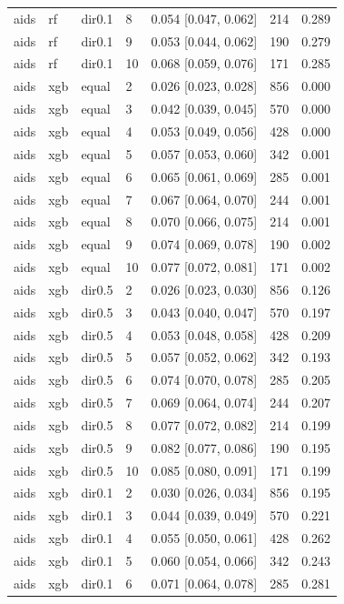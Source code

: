 \begin{tabular}{lllllll}
aids & rf & dir0.1 & 8 & 0.054 [0.047, 0.062] & 214 & 0.289 \\
aids & rf & dir0.1 & 9 & 0.053 [0.044, 0.062] & 190 & 0.279 \\
aids & rf & dir0.1 & 10 & 0.068 [0.059, 0.076] & 171 & 0.285 \\
aids & xgb & equal & 2 & 0.026 [0.023, 0.028] & 856 & 0.000 \\
aids & xgb & equal & 3 & 0.042 [0.039, 0.045] & 570 & 0.000 \\
aids & xgb & equal & 4 & 0.053 [0.049, 0.056] & 428 & 0.000 \\
aids & xgb & equal & 5 & 0.057 [0.053, 0.060] & 342 & 0.001 \\
aids & xgb & equal & 6 & 0.065 [0.061, 0.069] & 285 & 0.001 \\
aids & xgb & equal & 7 & 0.067 [0.064, 0.070] & 244 & 0.001 \\
aids & xgb & equal & 8 & 0.070 [0.066, 0.075] & 214 & 0.001 \\
aids & xgb & equal & 9 & 0.074 [0.069, 0.078] & 190 & 0.002 \\
aids & xgb & equal & 10 & 0.077 [0.072, 0.081] & 171 & 0.002 \\
aids & xgb & dir0.5 & 2 & 0.026 [0.023, 0.030] & 856 & 0.126 \\
aids & xgb & dir0.5 & 3 & 0.043 [0.040, 0.047] & 570 & 0.197 \\
aids & xgb & dir0.5 & 4 & 0.053 [0.048, 0.058] & 428 & 0.209 \\
aids & xgb & dir0.5 & 5 & 0.057 [0.052, 0.062] & 342 & 0.193 \\
aids & xgb & dir0.5 & 6 & 0.074 [0.070, 0.078] & 285 & 0.205 \\
aids & xgb & dir0.5 & 7 & 0.069 [0.064, 0.074] & 244 & 0.207 \\
aids & xgb & dir0.5 & 8 & 0.077 [0.072, 0.082] & 214 & 0.199 \\
aids & xgb & dir0.5 & 9 & 0.082 [0.077, 0.086] & 190 & 0.195 \\
aids & xgb & dir0.5 & 10 & 0.085 [0.080, 0.091] & 171 & 0.199 \\
aids & xgb & dir0.1 & 2 & 0.030 [0.026, 0.034] & 856 & 0.195 \\
aids & xgb & dir0.1 & 3 & 0.044 [0.039, 0.049] & 570 & 0.221 \\
aids & xgb & dir0.1 & 4 & 0.055 [0.050, 0.061] & 428 & 0.262 \\
aids & xgb & dir0.1 & 5 & 0.060 [0.054, 0.066] & 342 & 0.243 \\
aids & xgb & dir0.1 & 6 & 0.071 [0.064, 0.078] & 285 & 0.281 \\

\end{tabular}

